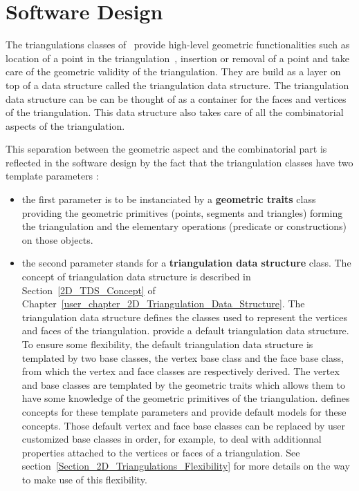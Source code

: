 \section{Software Design}
\label{Section_2D_Triangulations_Software_Design}

The triangulations  classes of \cgal\  
provide high-level geometric functionalities
such as location of a point in the triangulation~\cite{dpt-wt-02}, insertion
or removal of a point and take care of the geometric validity
of the triangulation.
They are build as a layer on top of a data structure
called the triangulation data structure.
The triangulation data structure  can be can be thought 
of as a container for the faces and vertices of the triangulation.
This data structure  also takes care
of all the combinatorial aspects of the triangulation.

This separation between the
geometric aspect and the combinatorial part
is reflected in the software design by the fact
that the triangulation classes have two template parameters :

\begin{itemize}
\item {} the first parameter is to be instanciated by a
\textbf{geometric traits} class providing 
the geometric primitives (points, segments and triangles) 
forming  the triangulation and the elementary
operations (predicate or constructions) on those objects.

\item {} the second parameter stands for a
\textbf{triangulation data structure} class. The concept
of triangulation data structure is described in
 Section~\ref{2D_TDS_Concept} of
Chapter~\ref{user_chapter_2D_Triangulation_Data_Structure}.
The triangulation data structure defines the classes
used to represent the vertices and faces of the triangulation.
\cgal provide a default triangulation data structure.
To ensure some flexibility, the default triangulation data structure
is templated by two base classes, the vertex base class and the 
face base class, from which the vertex and face classes are respectively
derived.
The vertex and base classes are templated by the geometric
traits which allows them to have some knowledge of the geometric
primitives of the triangulation. 
\cgal defines concepts 
for these template parameters
and provide default models for these concepts.
Those default vertex and  face base classes
can be replaced by 
user customized base classes in order, for example, to deal
with additionnal properties attached to the vertices or faces
of a triangulation. See section~\ref{Section_2D_Triangulations_Flexibility}
for more details on the way to make use of this flexibility.
\end{itemize}

